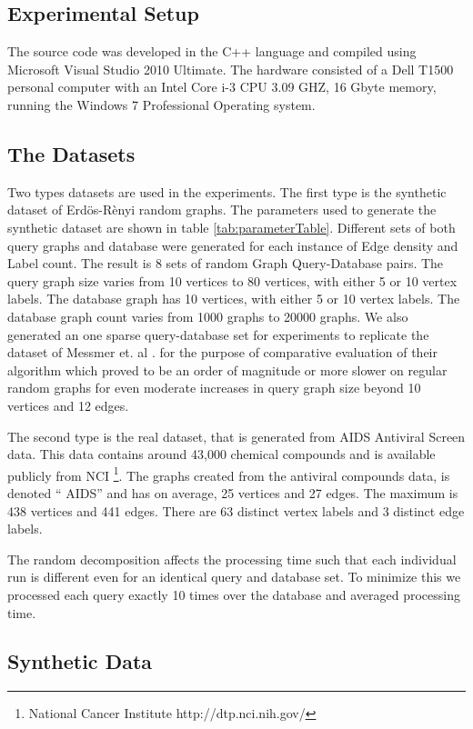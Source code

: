 
\subsection{Experimental Setup}
The source code was developed in the C++ language and compiled using Microsoft Visual Studio 2010 Ultimate. The hardware consisted of a Dell T1500 personal computer with an
Intel Core i-3 CPU 3.09 GHZ, 16 Gbyte memory, running the Windows 7 Professional Operating system.

\subsection{The Datasets}

Two types datasets are used in the experiments. The first type is the synthetic dataset of Erd\"{o}s-R\`{e}nyi random graphs. The parameters used to generate the synthetic dataset are shown in table \ref{tab:parameterTable}. Different sets of both query graphs and database were generated for each instance of Edge density and Label count. The result is 8 sets of random Graph Query-Database pairs. The query graph size varies from 10 vertices to 80 vertices, with either 5 or 10 vertex labels. The database graph has 10 vertices, with either 5 or 10 vertex labels. The database graph count varies from 1000 graphs to 20000 graphs. We also generated an one sparse query-database set for experiments to replicate the dataset of Messmer et. al \cite{messmer_bunke2000}. for the purpose of comparative evaluation of their algorithm which proved to be an order of magnitude or more slower on regular random graphs for even moderate increases in query graph size beyond 10 vertices and 12 edges.

The second type is the real dataset, that is generated from AIDS Antiviral Screen data. This data contains around 43,000 chemical compounds and is available publicly from NCI \footnote{National Cancer Institute http://dtp.nci.nih.gov/}. The graphs created from the antiviral compounds data, is denoted `` AIDS'' and has on average, 25 vertices and 27 edges. The maximum is 438 vertices and 441 edges. There are 63 distinct vertex labels and 3 distinct edge labels.

The random decomposition affects the processing time such that each individual run is different even for an identical query and database set. To minimize this we processed each query exactly 10 times over the database and averaged processing time.

\subsection{Synthetic Data}


